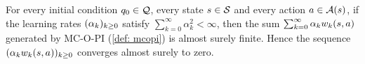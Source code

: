 
\begin{lemma}
\label{thm: effects of noise decrease}
    For every initial condition $q_0 \in \mathcal{Q}$,
    every state $s \in \mathcal{S}$ 
    and every action $a \in \mathcal{A}(s)$,
    if the learning rates $(\alpha_k)_{k \geq 0}$ satisfy 
    $\sum_{k = 0}^{\infty} \alpha_k^2 < \infty$,
    then the sum $\sum_{k=0}^\infty \alpha_k w_k(s,a)$ generated by MC-O-PI (\autoref{def: mcopi}) is almost surely finite.
    Hence the sequence $(\alpha_k w_k(s,a))_{k \ge 0}$ converges almost surely to zero.
\end{lemma}


